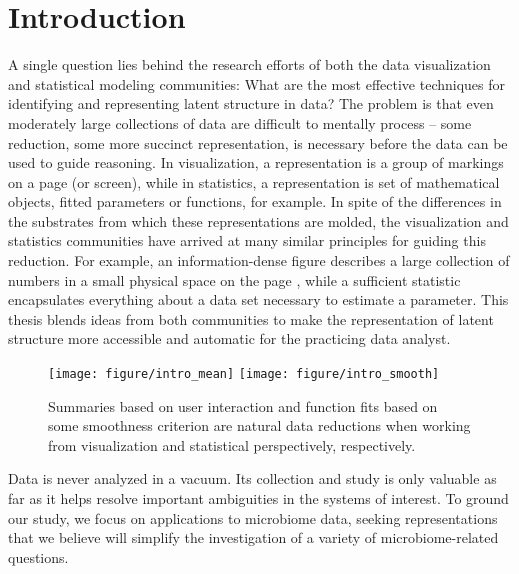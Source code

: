 \chapter{Introduction}
\label{ch:introduction}

A single question lies behind the research efforts of both the data
visualization and statistical modeling communities: What are the most effective
techniques for identifying and representing latent structure in data? The
problem is that even moderately large collections of data are difficult to
mentally process -- some reduction, some more succinct representation, is
necessary before the data can be used to guide reasoning. In visualization, a
representation is a group of markings on a page (or screen), while in
statistics, a representation is set of mathematical objects, fitted parameters
or functions, for example. In spite of the differences in the substrates from
which these representations are molded, the visualization and statistics
communities have arrived at many similar principles for guiding this reduction.
For example, an information-dense figure describes a large collection of numbers
in a small physical space on the page \citep{tufte2014visual}, while a
sufficient statistic encapsulates everything about a data set necessary to
estimate a parameter. This thesis blends ideas from both communities to make the
representation of latent structure more accessible and automatic for the
practicing data analyst.

\begin{figure}
  \centering
  \texttt{[image: figure/intro\_mean]}
  \texttt{[image: figure/intro\_smooth]}
  \caption{Summaries based on user interaction and function fits based on some
    smoothness criterion are natural data reductions when working from
    visualization and statistical perspectively, respectively.}
\end{figure}

Data is never analyzed in a vacuum. Its collection and study is only valuable
as far as it helps resolve important ambiguities in the systems of interest. To
ground our study, we focus on applications to microbiome data, seeking
representations that we believe will simplify the investigation of a variety of
microbiome-related questions.

